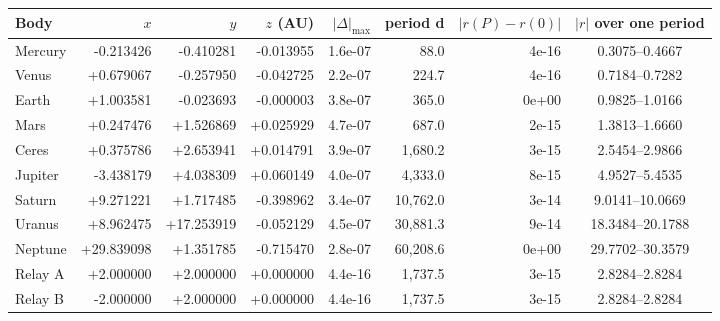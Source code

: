 \par\noindent
\begin{tabular}{lrrrrrrc}
\toprule
Body & $x$ & $y$ & $z$ (AU) & $|\Delta|_{\max}$ & period d & $|r(P)-r(0)|$ & $|r|$ over one period\\
\midrule
Mercury & -0.213426 & -0.410281 & -0.013955 & 1.6e-07 & 88.0 & 4e-16 & 0.3075--0.4667\\
Venus & +0.679067 & -0.257950 & -0.042725 & 2.2e-07 & 224.7 & 4e-16 & 0.7184--0.7282\\
Earth & +1.003581 & -0.023693 & -0.000003 & 3.8e-07 & 365.0 & 0e+00 & 0.9825--1.0166\\
Mars & +0.247476 & +1.526869 & +0.025929 & 4.7e-07 & 687.0 & 2e-15 & 1.3813--1.6660\\
Ceres & +0.375786 & +2.653941 & +0.014791 & 3.9e-07 & 1{,}680.2 & 3e-15 & 2.5454--2.9866\\
Jupiter & -3.438179 & +4.038309 & +0.060149 & 4.0e-07 & 4{,}333.0 & 8e-15 & 4.9527--5.4535\\
Saturn & +9.271221 & +1.717485 & -0.398962 & 3.4e-07 & 10{,}762.0 & 3e-14 & 9.0141--10.0669\\
Uranus & +8.962475 & +17.253919 & -0.052129 & 4.5e-07 & 30{,}881.3 & 9e-14 & 18.3484--20.1788\\
Neptune & +29.839098 & +1.351785 & -0.715470 & 2.8e-07 & 60{,}208.6 & 0e+00 & 29.7702--30.3579\\
Relay A & +2.000000 & +2.000000 & +0.000000 & 4.4e-16 & 1{,}737.5 & 3e-15 & 2.8284--2.8284\\
Relay B & -2.000000 & +2.000000 & +0.000000 & 4.4e-16 & 1{,}737.5 & 3e-15 & 2.8284--2.8284\\
\bottomrule
\end{tabular}\par
